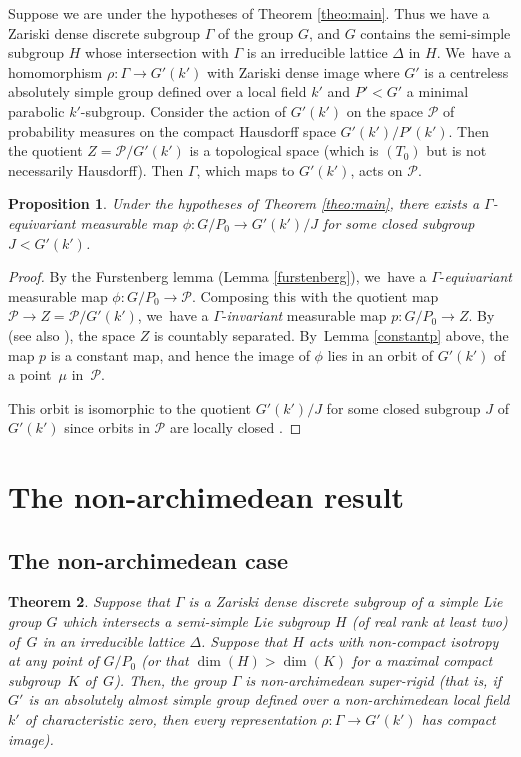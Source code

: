 \documentclass[10pt,a4paper]{amsart}
\newcommand{\Subsection}{\subsection}
\newtheorem{theorem}{Theorem}
\newtheorem{proposition}[theorem]{Proposition}
\theoremstyle{definition}
\let\D\Delta
\let\G\Gamma
\begin{document}
Suppose we are under the hypotheses of Theorem \ref{theo:main}. Thus we have a Zariski dense discrete subgroup $\G$ of the group $G$, and $G$ contains the semi-simple subgroup $H$ whose intersection with $\G$ is an irreducible lattice $\D$
in $H$. We~have a homomorphism $\rho: \G \to G'(k')$ with Zariski dense image where $G'$ is a centreless absolutely simple group defined over a local field $k'$ and $P'<G'$ a minimal parabolic $k'$-subgroup. Consider the action of $G'(k')$ on the space $\mathcal P$ of probability measures on the compact Hausdorff space $G'(k')/P'(k')$. Then the quotient $Z=\mathcal{P}/G'(k')$ is a topological space (which is $(T_0)$ but is not necessarily Hausdorff). Then $\G$, which maps to $G'(k')$, acts on $\mathcal P$.

\begin{proposition} \label{oneorbit} Under the hypotheses of Theorem \ref{theo:main}, there exists a $\G$-equivariant measurable map $\phi: G/P_0 \to G'(k')/J$ for some closed subgroup $J< G'(k')$.
\end{proposition}

\begin{proof} By the Furstenberg lemma (Lemma \ref{furstenberg}), we~have a $\G$-\emph{equivariant} measurable map $\phi : G/P_0 \to \mathcal{P}$. Composing this with the quotient map $\mathcal{P} \to Z=\mathcal{P}/G'(k')$, we~have a $\G$-\emph{invariant} measurable map $p: G/P_0 \to Z$. By~\cite[Cor.\,(3.2.17)]{Z} (see also \cite[(2.1.9)]{Z}), the space $Z$ is countably separated. By~Lemma \ref{constantp} above, the map $p$ is a constant map, and hence the image of $\phi $ lies in an orbit of $G'(k')$ of a point~$\mu $ in~$\mathcal P$.

This orbit is isomorphic to the quotient $G'(k')/J$ for some closed subgroup $J$ of $G'(k')$ since orbits in $\mathcal P$ are locally closed \cite[Prop.\,(2.1.10) \& Cor.\,(3.2.17)]{Z}.
\end{proof}

\section{The non-archimedean result}
\Subsection{The non-archimedean case}

\begin{theorem}\label{nonarch} Suppose that $\Gamma $ is a Zariski dense discrete subgroup of a simple Lie group $G$ which intersects a semi-simple Lie subgroup $H$ (of real rank at least two) of~$G$ in an
irreducible lattice $\Delta$. Suppose that $H$ acts with non-compact isotropy at any point of $G/P_0$ {\rm(}or that $\dim (H)>\dim(K)$ for a maximal compact subgroup~$K$ of~$G$). Then, the group $\Gamma $ is
non-archimedean super-rigid (that is, if $G'$ is an absolutely almost simple group defined over a non-archimedean local field $k'$ of characteristic zero, then every representation $\rho : \G \to G'(k')$ has compact image{\rm)}.
\end{theorem}
\end{document}
